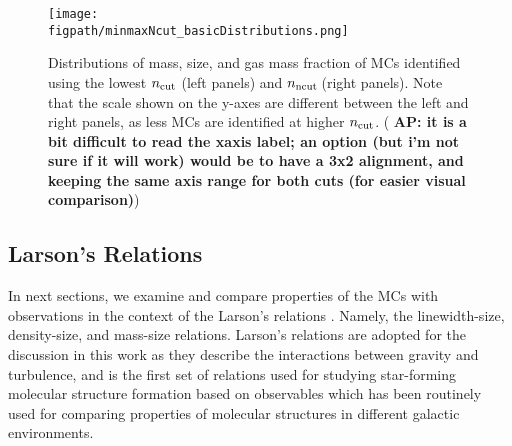 \IfFileExists{emulateapjlegacy.cls}{\documentclass[iop]{emulateapjlegacy}}{\documentclass[iop]{emulateapj}}
\newcommand{\AP}[1]{({\bf \color{apcolor} AP: #1})}
\def\figpath{./Fig}
\begin{document}
\begin{figure*}[htbp]
\centering
\texttt{[image: \\figpath/minmaxNcut\_basicDistributions.png]}
\caption{Distributions of mass, size, and gas mass fraction of MCs identified using the lowest $n_{\rm cut}$ (left panels) and $n_{\rm ncut}$\,\cc (right panels).
%
Note that the scale shown on the y-axes are different between the left and right panels, as less MCs are identified at higher $n_{\rm cut}$.
\AP{it is a bit difficult to read the xaxis label; an option (but i'm not sure if it will work) would be to have a 3x2 alignment, and keeping the same axis range for both cuts (for easier visual comparison)}
\label{fig:dist}}
\end{figure*}


\subsection{Larson's Relations}\label{sec:PVE}

In next sections, we examine and compare properties of the MCs with observations in the context of the Larson's relations \citep{Larson81a}. Namely, the linewidth-size, density-size, and mass-size relations. Larson's relations are adopted for the discussion in this work as they  describe the interactions between gravity and turbulence, and is the first set of relations used for studying star-forming molecular structure formation based on observables which has been routinely used for comparing properties of molecular structures in different galactic environments.
\end{document}
